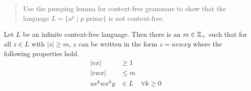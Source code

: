 \documentclass{article}
\begin{document}
\section{}
\begin{quote}
    Use the pumping lemma for context-free grammars to show that the language $L = \{a^p \mid p \text{ prime}\}$ is not context-free.

\end{quote}

\begin{lemma}
    Let $L$ be an infinite context-free language.
    Then there is an $m \in \mathbb{Z}_+$ such that for all $z \in L$ with $\vert z \vert \geq m$, $z$ can be written in the form $z = uvwxy$ where the following properties hold.
    \begin{align*}
        \vert vx \vert  & \geq 1                    \\
        \vert vwx \vert & \leq m                    \\
        u v^k w x^k y   & \in L  & \forall k \geq 0
    \end{align*}
\end{lemma}
\end{document}
